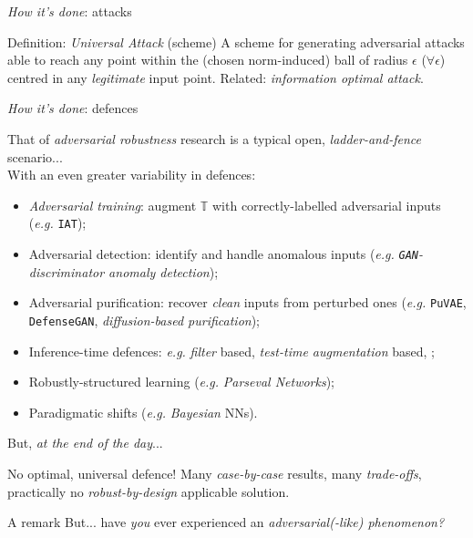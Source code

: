 {\begin{frame}{ \textit{How it's done}: attacks}
        \begin{block}{Definition: \textit{Universal Attack} (scheme)}
            A scheme for generating adversarial attacks able to reach \alert{any} point within the (chosen norm-induced) ball of radius $\epsilon$ ($\forall \epsilon$) centred in any \textit{legitimate} input point. Related: \textit{information \alert{optimal} attack}.
        \end{block}
    \end{frame}

    \begin{frame}{ \textit{How it's done}: defences}

        That of \textit{adversarial robustness} research is a typical open, \textit{ladder-and-fence} scenario...\\
        With an even greater variability in defences:
        \begin{itemize}
            \item \textit{Adversarial training}: \alert{augment} $\mathbb{T}$ with correctly-labelled adversarial inputs (\textit{e.g.} \texttt{IAT});
            \item Adversarial detection: \alert{identify and handle} anomalous inputs (\textit{e.g.} \textit{\texttt{GAN}-discriminator anomaly detection});
            \item Adversarial purification: \alert{recover} \textit{clean} inputs from perturbed ones (\textit{e.g.} \texttt{PuVAE}, \texttt{DefenseGAN}, \textit{diffusion-based purification});
            \item \alert{Inference}-time defences: \textit{e.g.} \textit{filter} based, \textit{test-time augmentation} based, \etc;
            \item Robustly-\alert{structured} learning (\textit{e.g.} \textit{Parseval Networks});
            \item Paradigmatic shifts (\textit{e.g.} \textit{Bayesian} NNs).
        \end{itemize}
    \end{frame}

    \begin{frame}{ But, \textit{at the end of the day}...}

        No optimal, universal defence! Many \textit{case-by-case} results, many \textit{trade-offs}, practically no \textit{robust-by-design} applicable solution.
        \hfill\break

        \begin{block}{A remark}
            But... have \textit{\alert{you}} ever experienced an \textit{adversarial(-like) phenomenon?}
        \end{block}

    \end{frame}


}